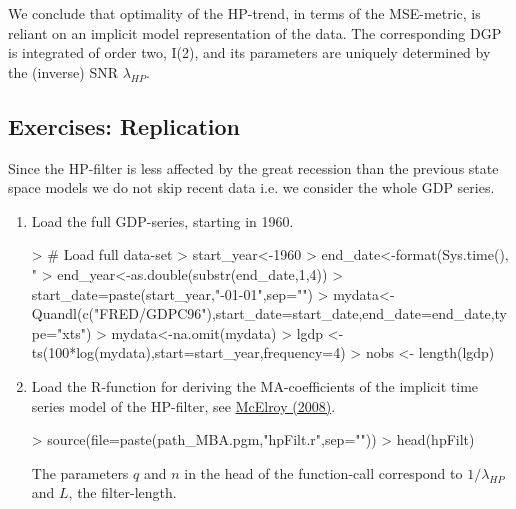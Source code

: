 \documentclass[a4paper]{book}
\begin{document}
We conclude that optimality of the HP-trend, in terms of the MSE-metric, is reliant on an implicit model representation of the data. The corresponding DGP is integrated of order two, I(2), and its parameters are uniquely determined by the (inverse) SNR $\lambda_{HP}$.



\subsection{Exercises: Replication}\label{hp_exe_repli}



Since the HP-filter is less affected by the great recession than the previous state space models we do not skip recent data i.e. we consider the whole GDP series. 
\begin{enumerate}
\item Load the full GDP-series, starting in 1960.
\begin{Schunk}
\begin{Sinput}
> # Load full data-set
> start_year<-1960
> end_date<-format(Sys.time(), "%
> end_year<-as.double(substr(end_date,1,4))
> start_date=paste(start_year,"-01-01",sep="")
> mydata<-Quandl(c("FRED/GDPC96"),start_date=start_date,end_date=end_date,type="xts")
> mydata<-na.omit(mydata)
> lgdp <- ts(100*log(mydata),start=start_year,frequency=4)
> nobs <- length(lgdp)
\end{Sinput}
\end{Schunk}
\item Load the R-function for deriving the MA-coefficients of the implicit time series model of the HP-filter, see \href{https://www.dropbox.com/s/s8zb0buqzygefby/mcelroy_hp.pdf?dl=0}{McElroy (2008)}.
\begin{Schunk}
\begin{Sinput}
> source(file=paste(path_MBA.pgm,"hpFilt.r",sep=""))
> head(hpFilt)
\end{Sinput}
\begin{Soutput}
1 function (q, n)                                                  
2 {                                                                
3     absZ <- (sqrt(q) + sqrt(q + 16) + sqrt(2 * q + 2 * sqrt(q) * 
4         sqrt(q + 16)))/4                                         
5     c <- q/(absZ^2)                                              
6     theta <- atan(sqrt(2 * q + 2 * sqrt(q) * sqrt(q + 16))/4)    
\end{Soutput}
\end{Schunk}
The parameters $q$ and $n$ in the head of the function-call correspond to $1/\lambda_{HP}$ and $L$, the filter-length.

\end{enumerate}
\end{document}
